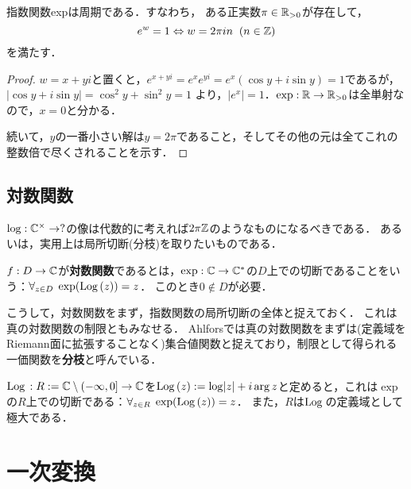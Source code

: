 \documentclass[uplatex, dvipdfmx]{jsreport}
\begin{document}
\begin{theorem}[指数関数の周期性]\label{thm-period-of-exponential}
    指数関数expは周期である．すなわち，
    ある正実数$\pi\in\mathbb{R}_{>0}$が存在して，
    \[ e^w=1\Leftrightarrow w=2\pi in\;\;(n\in\mathbb{Z}) \]
    を満たす．
\end{theorem}
\begin{proof}\mbox{}
    $w=x+yi$と置くと，$e^{x+yi}=e^xe^{yi}=e^x(\cos y+i\sin y)=1$であるが，$|\cos y+i\sin y|=\cos^2y+\sin^2y=1$
    より，$|e^x|=1$．$\exp:\mathbb{R}\to\mathbb{R}_{>0}$は全単射なので，$x=0$と分かる．

    続いて，$y$の一番小さい解は$y=2\pi$であること，そしてその他の元は全てこれの整数倍で尽くされることを示す．
\end{proof}

\subsection{対数関数}

\begin{tcolorbox}[colframe=ForestGreen, colback=ForestGreen!10!white,breakable,colbacktitle=ForestGreen!40!white,coltitle=black,fonttitle=\bfseries\sffamily,
title=]
    $\log:\mathbb{C}^\times\to?$の像は代数的に考えれば$2\pi\mathbb{Z}$のようなものになるべきである．
    あるいは，実用上は局所切断(分枝)を取りたいものである．
\end{tcolorbox}

\begin{definition}
    $f:D\to\mathbb{C}$が\textbf{対数関数}であるとは，$\exp:\mathbb{C}\to\mathbb{C}^*$の$D$上での切断であることをいう：$\forall_{z\in D}\;\exp(\mathrm{Log}\,(z))=z$．
    このとき$0\notin D$が必要．
\end{definition}
\begin{remarks}
    こうして，対数関数をまず，指数関数の局所切断の全体と捉えておく．
    これは真の対数関数の制限ともみなせる．
    Ahlforsでは真の対数関数をまずは(定義域をRiemann面に拡張することなく)集合値関数と捉えており，制限として得られる一価関数を\textbf{分枝}と呼んでいる．
\end{remarks}

\begin{theorem}
    $\mathrm{Log}\,:R:=\mathbb{C}\setminus(-\infty,0]\to\mathbb{C}$を$\mathrm{Log}\,(z):=\log\lvert z\rvert+i\arg z$と定めると，これは$\exp$の$R$上での切断である：$\forall_{z\in R}\;\exp(\mathrm{Log}\,(z))=z$．
    また，$R$は$\mathrm{Log}\,$の定義域として極大である．
\end{theorem}

\section{一次変換}
\end{document}
